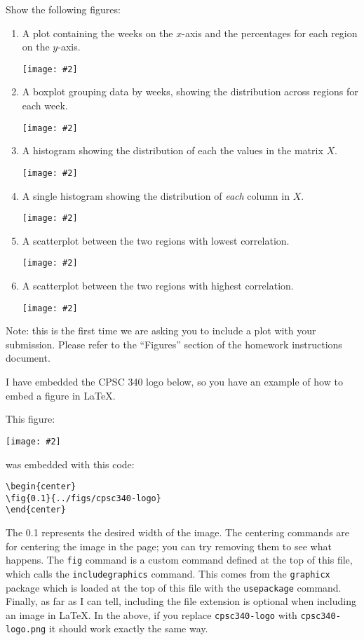 \documentclass{article}
\def\blu#1{{\color{blu}#1}}
\newcommand{\fig}[2]{\texttt{[image: \#2]}}
\def\enum#1{\begin{enumerate}#1\end{enumerate}}
\begin{document}
\blu{Show the following figures}:
\enum{
\item A plot containing the weeks on the $x$-axis and the percentages for each region on the $y$-axis.
\begin{center}
\fig{0.7}{../figs/q12_plotWeeksVsInfPer.pdf} %
\end{center}
\item A boxplot grouping data by weeks, showing the distribution across regions for each week.
\begin{center}
\fig{0.7}{../figs/q12_boxWeeksVsInfPer} %
\end{center}
\item A histogram showing the distribution of each the values in the matrix $X$.
\begin{center}
\fig{0.7}{../figs/q12_histAllReg} %
\end{center}
\item A single histogram showing the distribution of \emph{each} column in $X$.
\begin{center}
\fig{0.7}{../figs/q12_histEachReg} %
\end{center}
\item A scatterplot between the two regions with lowest correlation.
\begin{center}
\fig{0.7}{../figs/q12_lowCorrScatter} %
\end{center}
\item A scatterplot between the two regions with highest correlation.
\begin{center}
\fig{0.7}{../figs/q12_highCorrScatter} %
\end{center}
}

Note: this is the first time we are asking you to include a plot with your submission. Please refer to the ``Figures'' section of the homework instructions document.

I have embedded the CPSC 340 logo below, so you have an example of how to embed a figure in LaTeX.

This figure:
\begin{center}
\fig{0.1}{../figs/cpsc340-logo} %
\end{center}
was embedded with this code:
\begin{verbatim}
\begin{center}
\fig{0.1}{../figs/cpsc340-logo}
\end{center}
\end{verbatim}

The 0.1 represents the desired width of the image. The centering commands are for centering the image in the page; you can try removing them to see what happens. The \texttt{fig} command is a custom command defined at the top of this file, which calls the \texttt{includegraphics} command. This comes from the \texttt{graphicx} package which is loaded at the top of this file with the \texttt{usepackage} command. Finally, as far as I can tell, including the file extension is optional when including an image in LaTeX. In the above, if you replace \texttt{cpsc340-logo} with \texttt{cpsc340-logo.png} it should work exactly the same way.
\end{document}
